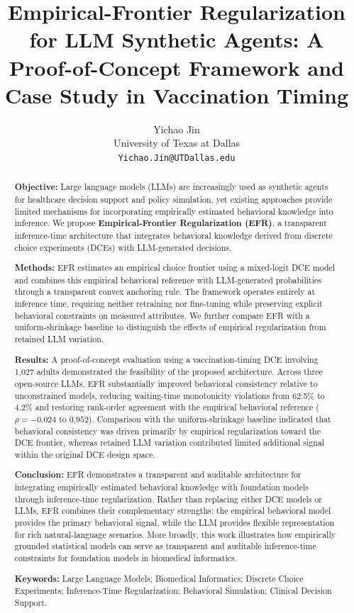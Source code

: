 \documentclass[11pt]{article}
\title{Empirical-Frontier Regularization for LLM Synthetic Agents: A Proof-of-Concept Framework and Case Study in Vaccination Timing}
\author{Yichao Jin \\ University of Texas at Dallas \\ \texttt{Yichao.Jin@UTDallas.edu}}
\date{}
\begin{document}
\maketitle

\begin{abstract}

\textbf{Objective:}
Large language models (LLMs) are increasingly used as synthetic agents for healthcare decision support and policy simulation, yet existing approaches provide limited mechanisms for incorporating empirically estimated behavioral knowledge into inference. We propose \textbf{Empirical-Frontier Regularization (EFR)}, a transparent inference-time architecture that integrates behavioral knowledge derived from discrete choice experiments (DCEs) with LLM-generated decisions.

\textbf{Methods:}
EFR estimates an empirical choice frontier using a mixed-logit DCE model and combines this empirical behavioral reference with LLM-generated probabilities through a transparent convex anchoring rule. The framework operates entirely at inference time, requiring neither retraining nor fine-tuning while preserving explicit behavioral constraints on measured attributes. We further compare EFR with a uniform-shrinkage baseline to distinguish the effects of empirical regularization from retained LLM variation.

\textbf{Results:}
A proof-of-concept evaluation using a vaccination-timing DCE involving 1,027 adults demonstrated the feasibility of the proposed architecture. Across three open-source LLMs, EFR substantially improved behavioral consistency relative to unconstrained models, reducing waiting-time monotonicity violations from 62.5\% to 4.2\% and restoring rank-order agreement with the empirical behavioral reference ($\rho=-0.024$ to $0.952$). Comparison with the uniform-shrinkage baseline indicated that behavioral consistency was driven primarily by empirical regularization toward the DCE frontier, whereas retained LLM variation contributed limited additional signal within the original DCE design space.

\textbf{Conclusion:}
EFR demonstrates a transparent and auditable architecture for integrating empirically estimated behavioral knowledge with foundation models through inference-time regularization. Rather than replacing either DCE models or LLMs, EFR combines their complementary strengths: the empirical behavioral model provides the primary behavioral signal, while the LLM provides flexible representation for rich natural-language scenarios. More broadly, this work illustrates how empirically grounded statistical models can serve as transparent and auditable inference-time constraints for foundation models in biomedical informatics.

\noindent\textbf{Keywords:}
Large Language Models; Biomedical Informatics; Discrete Choice Experiments; Inference-Time Regularization; Behavioral Simulation; Clinical Decision Support.

\end{abstract}
\end{document}
